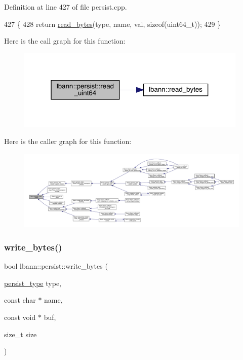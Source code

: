 Definition at line 427 of file persist.\+cpp.


\begin{DoxyCode}
427                                                                                  \{
428   \textcolor{keywordflow}{return} \hyperlink{classlbann_1_1persist_af24f635f634c8cf30cf53a0e90ec641b}{read\_bytes}(type, name, val, \textcolor{keyword}{sizeof}(uint64\_t));
429 \}
\end{DoxyCode}
Here is the call graph for this function\+:\nopagebreak
\begin{figure}[H]
\begin{center}
\leavevmode
\includegraphics[width=313pt]{classlbann_1_1persist_aa6d996db3714a7ae055adac0d8e8ac63_cgraph}
\end{center}
\end{figure}
Here is the caller graph for this function\+:\nopagebreak
\begin{figure}[H]
\begin{center}
\leavevmode
\includegraphics[width=350pt]{classlbann_1_1persist_aa6d996db3714a7ae055adac0d8e8ac63_icgraph}
\end{center}
\end{figure}
\mbox{\label{classlbann_1_1persist_a8729c7c90f4ca3090cd678fce91a0eb0}} 
\subsubsection{\texorpdfstring{write\+\_\+bytes()}{write\_bytes()}}
{\footnotesize\ttfamily bool lbann\+::persist\+::write\+\_\+bytes (\begin{DoxyParamCaption}\item[{\hyperlink{namespacelbann_adee41f31f15f3906cbdcce4a1417eb56}{persist\+\_\+type}}]{type,  }\item[{const char $\ast$}]{name,  }\item[{const void $\ast$}]{buf,  }\item[{size\+\_\+t}]{size }\end{DoxyParamCaption})}



